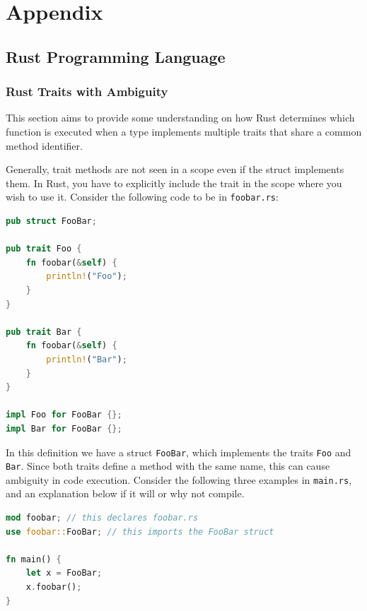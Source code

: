 \documentclass[11pt,
               a4paper,
               bibtotoc,
               idxtotoc,
               headsepline,
               footsepline,
               footexclude,
               BCOR12mm,
               DIV13,
               openany,   %
               ]
               {scrbook}
\begin{document}
\appendix
\part{Appendix}

\chapter{Rust Programming Language}

\section{Rust Traits with Ambiguity}\label{section:rust-trait-same-identifier}

This section aims to provide some understanding on how Rust determines which function is executed when a type implements multiple traits that share a common method identifier.

Generally, trait methods are not seen in a scope even if the struct implements them. In Rust, you have to explicitly include the trait in the scope where you wish to use it. Consider the following code to be in \texttt{foobar.rs}:

\vspace{0.5em}
\begin{lstlisting}[style=eclipse-rust, language=Rust, basicstyle=\ttfamily\small]
pub struct FooBar;

pub trait Foo {
    fn foobar(&self) {
        println!("Foo");
    }
}

pub trait Bar {
    fn foobar(&self) {
        println!("Bar");
    }
}

impl Foo for FooBar {};
impl Bar for FooBar {};
\end{lstlisting}

In this definition we have a struct \texttt{FooBar}, which implements the traits \texttt{Foo} and \texttt{Bar}. Since both traits define a method with the same name, this can cause ambiguity in code execution. Consider the following three examples in \texttt{main.rs}, and an explanation below if it will or why not compile.

\vspace{0.5em}
\begin{lstlisting}[style=eclipse-rust, language=Rust, basicstyle=\ttfamily\small]
mod foobar; // this declares foobar.rs 
use foobar::FooBar; // this imports the FooBar struct

fn main() {
    let x = FooBar;
    x.foobar();
}
\end{lstlisting}
\end{document}
